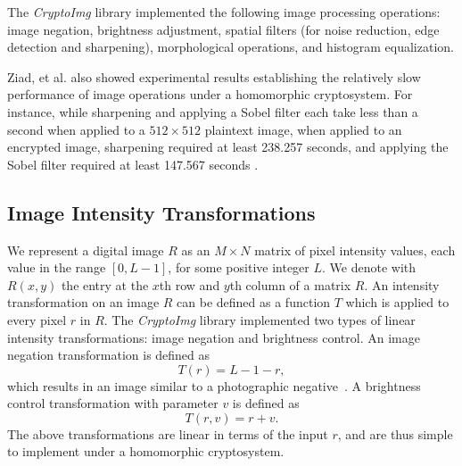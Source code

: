 The \textit{CryptoImg} library implemented the following image processing operations: image negation, brightness adjustment, spatial filters (for noise reduction, edge detection and sharpening), morphological operations, and histogram equalization.


Ziad, et al. also showed experimental results establishing the relatively slow performance of image operations under a homomorphic cryptosystem. For instance, while sharpening and applying a Sobel filter each take less than a second when applied to a $512\times 512$ plaintext image, when applied to an encrypted image, sharpening required at least 238.257 seconds, and applying the Sobel filter required at least 147.567 seconds \cite{ziad_cryptoimg:_2016}.



\subsection{Image Intensity Transformations}
We represent a digital image $R$ as an $M \times N$ matrix of pixel intensity values, each value in the range $\left[0, L-1\right]$, for some positive integer $L$. We denote with $R(x,y)$ the entry at the $x$th row and $y$th column of a matrix $R$.
An intensity transformation on an image $R$ can be defined as a function $T$ which is applied to every pixel $r$ in $R$.
The \textit{CryptoImg} library implemented two types of linear intensity transformations: image negation and brightness control. An image negation transformation is defined as
\begin{equation}
    T\left(r\right) = L-1-r,
\end{equation}
which results in an image similar to a photographic negative~\cite{gonzalez_digital_2008}.
A brightness control transformation with parameter $v$ is defined as
\begin{equation}
    T\left(r,v\right) = r+v.
\end{equation}
The above transformations are linear in terms of the input $r$, and are thus simple to implement under a homomorphic cryptosystem.

